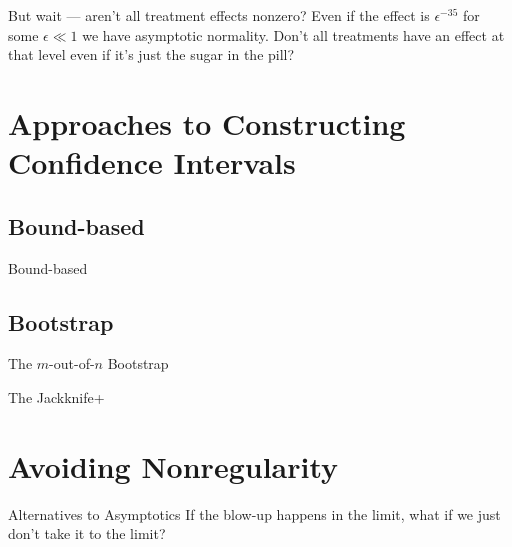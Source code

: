 \documentclass[aspectratio=169, professionalfonts]{beamer}
\begin{document}
\begin{frame}{But wait --- aren't all treatment effects nonzero?}
	Even if the effect is $\epsilon^{-35}$ for some $\epsilon \ll 1$ we have asymptotic
	normality. Don't all treatments have an  effect at that level even if it's
	just the sugar in the pill?
\end{frame}



\section{Approaches to Constructing Confidence Intervals}
\subsection{Bound-based}
\begin{frame}{Bound-based}
\end{frame}
\subsection{Bootstrap}
\begin{frame}{The $m$-out-of-$n$ Bootstrap}
\end{frame}

\begin{frame}{The Jackknife+}
\end{frame}

\section{Avoiding Nonregularity}
\begin{frame}{Alternatives to Asymptotics}
	If the blow-up happens in the limit, what if we just don't take it to the limit?


\end{frame}
\end{document}
